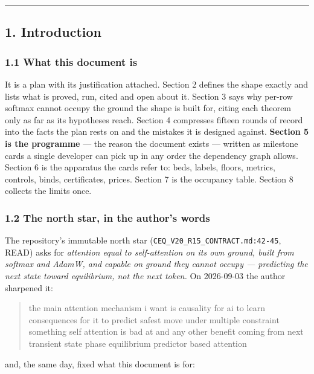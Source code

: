 \documentclass[11pt,a4paper]{article}
\theoremstyle{plain}
\theoremstyle{definition}
\theoremstyle{remark}
\begin{document}
\begin{center}\rule{0.5\linewidth}{0.5pt}\end{center}

\subsection{1. Introduction}\label{introduction}

\subsubsection{1.1 What this document is}\label{what-this-document-is}

It is a plan with its justification attached. Section 2 defines the
shape exactly and lists what is proved, run, cited and open about it.
Section 3 says why per-row softmax cannot occupy the ground the shape is
built for, citing each theorem only as far as its hypotheses reach.
Section 4 compresses fifteen rounds of record into the facts the plan
rests on and the mistakes it is designed against. \textbf{Section 5 is
the programme} --- the reason the document exists --- written as
milestone cards a single developer can pick up in any order the
dependency graph allows. Section 6 is the apparatus the cards refer to:
beds, labels, floors, metrics, controls, binds, certificates, prices.
Section 7 is the occupancy table. Section 8 collects the limits once.

\subsubsection{1.2 The north star, in the author's
words}\label{the-north-star-in-the-authors-words}

The repository's immutable north star
(\texttt{CEQ\_V20\_R15\_CONTRACT.md:42-45}, READ) asks for
\emph{attention equal to self-attention on its own ground, built from
softmax and AdamW, and capable on ground they cannot occupy ---
predicting the next state toward equilibrium, not the next token.} On
2026-09-03 the author sharpened it:

\begin{quote}
the main attention mechanism i want is causality for ai to learn
consequences for it to predict safest move under multiple constraint
something self attention is bad at and any other benefit coming from
next transient state phase equilibrium predictor based attention
\end{quote}

and, the same day, fixed what this document is for:
\end{document}
